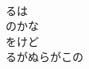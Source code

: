 \documentclass[10pt,b5j]{tarticle} %
\begin{document}
\begin{enumerate}
\begin{minipage}[c]{\blocksize}
    \end{minipage}
    \begin{minipage}[c]{\blocksize}
        
        \vspace{\linespace}
        \item~\\
        るは\\
        のかな\\
        をけど\\
        るがぬらがこの
    
    \end{minipage}
\end{enumerate} %
\end{document}
